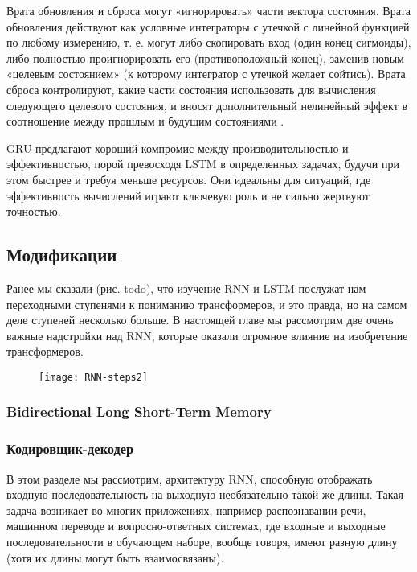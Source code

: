 Врата обновления и сброса могут «игнорировать» части вектора состояния. 
Врата обновления действуют как условные интеграторы с утечкой с линейной
функцией по любому измерению, т. е. могут либо скопировать вход (один конец 
сигмоиды), либо полностью проигнорировать его (противоположный конец), заменив
новым «целевым состоянием» (к которому интегратор с утечкой желает сойтись).
Врата сброса контролируют, какие части состояния использовать для вычисления 
следующего целевого состояния, и вносят дополнительный нелинейный эффект в 
соотношение между прошлым и будущим состояниями \cite{Goodfellow-et-al-2016}.

GRU предлагают хороший компромис между производительностью и эффективностью, 
порой превосходя LSTM в определенных задачах, будучи при этом быстрее и 
требуя меньше ресурсов. Они идеальны для ситуаций, где эффективность 
вычислений играют ключевую роль и не сильно жертвуют точностью.

\subsection{Модификации}

Ранее мы сказали (рис. {\color{red} todo}), что изучение RNN и LSTM послужат нам 
переходными ступенями к пониманию трансформеров, и это правда, но на самом деле 
ступеней несколько больше. В настоящей главе мы рассмотрим две очень важные надстройки 
над RNN, которые оказали огромное влияние на изобретение трансформеров.

\begin{figure}[h!]
    \centering
    \texttt{[image: RNN-steps2]}
    \caption{\cite{statquest_ml_series}}
    \label{fig:RNN-steps2}
\end{figure}

\subsubsection{\color{red}Bidirectional Long Short-Term Memory}

\subsubsection{Кодировщик-декодер}

В этом разделе мы рассмотрим, архитектуру RNN, способную отображать входную 
последовательность на выходную необязательно такой же длины. 
Такая задача возникает во многих
приложениях, например распознавании речи, машинном переводе и 
вопросно-ответных системах, где входные и выходные последовательности в 
обучающем наборе, вообще говоря, имеют разную длину 
(хотя их длины могут быть взаимосвязаны).

